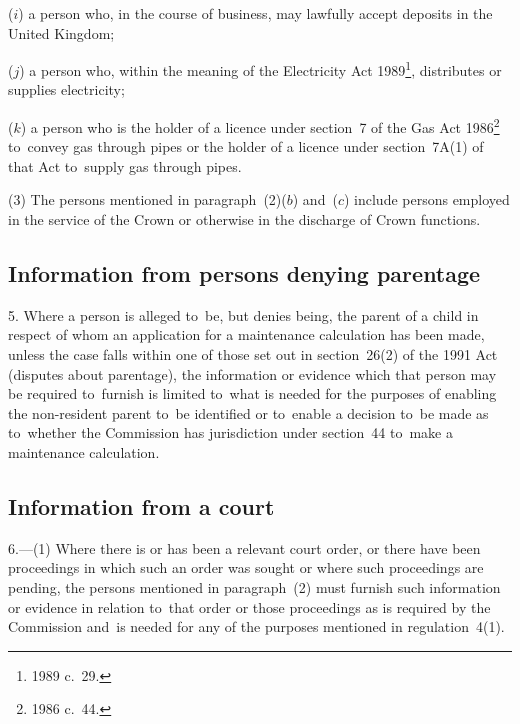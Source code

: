 \documentclass[12pt,a4paper]{article}
\begin{document}
\begin{enumerate}
($i$) a person who, in the course of business, may lawfully accept deposits in the United Kingdom;

($j$) a person who, within the meaning of the Electricity Act 1989\footnote{1989 c.~29.}, distributes or supplies electricity;

($k$) a person who is the holder of a licence under section~7 of the Gas Act 1986\footnote{1986 c.~44.} to~convey gas through pipes or the holder of a licence under section~7A(1) of that Act to~supply gas through pipes.
\end{enumerate}

(3) The persons mentioned in paragraph~(2)($b$)  and~($c$)  include persons employed in the service of the Crown or otherwise in the discharge of Crown functions.

\subsection[5. Information from persons denying parentage]{Information from persons denying parentage}

5.  Where a person is alleged to~be, but denies being, the parent of a child in respect of whom an application for a maintenance calculation has been made, unless the case falls within one of those set out in section~26(2) of the 1991 Act (disputes about parentage), the information or evidence which that person may be required to~furnish is limited to~what is needed for the purposes of enabling the non-resident parent to~be identified or to~enable a decision to~be made as to~whether the Commission has jurisdiction under section~44 to~make a maintenance calculation.

\subsection[6. Information from a court]{Information from a court}

6.---(1)  Where there is or has been a relevant court order, or there have been proceedings in which such an order was sought or where such proceedings are pending, the persons mentioned in paragraph~(2) must furnish such information or evidence in relation to~that order or those proceedings as is required by the Commission and~is needed for any of the purposes mentioned in regulation~4(1).
\end{document}

